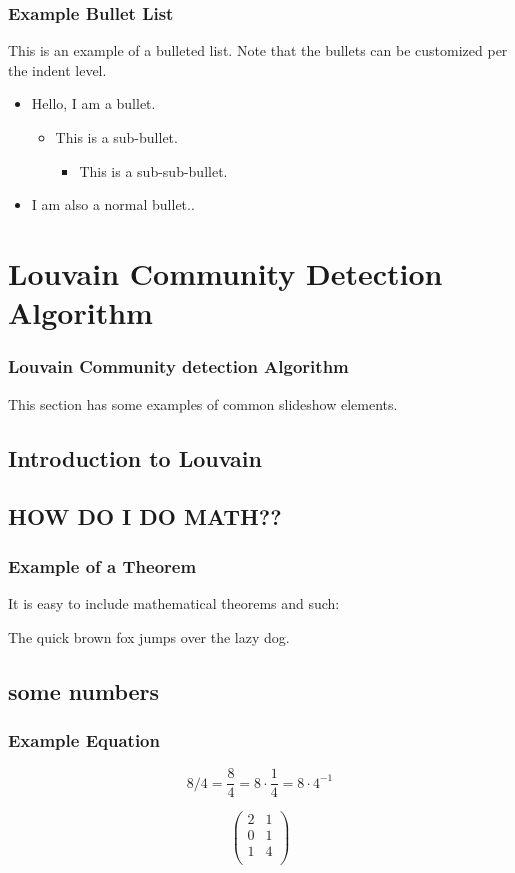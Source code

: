 \documentclass{beamer}
\begin{document}
\frame
{
	\frametitle{Example Bullet List}

	This is an example of a bulleted list. Note that the bullets can be customized per the indent level.
	
	\begin{itemize}
	\item Hello, I am a bullet.
	\begin{itemize}
		\item This is a sub-bullet.
		\begin{itemize}
			\item This is a sub-sub-bullet.
		\end{itemize}
	\end{itemize}
	\vspace{\baselineskip}
	\item I am also a normal bullet..
	\end{itemize}
}

\section{Louvain Community Detection Algorithm}

\frame
{
	\frametitle{Louvain Community detection Algorithm}

	This section has some examples of common slideshow elements.
}

\subsection{Introduction to Louvain}

\frame
{
	
}

\subsection{HOW DO I DO MATH??}
\frame
{
	\frametitle{Example of a Theorem}
	It is easy to include mathematical theorems and such:
	\begin{theorem}
	The quick brown fox jumps over the lazy dog.
	\end{theorem}
}


\subsection{some numbers}
\frame
{
	\frametitle{Example Equation}

	\[8 / 4 = \frac{8}{4} = 8 \cdot \frac{1}{4} = 8 \cdot 4^{-1}\]
	
	\[\left( \begin{array}{cc}
	2 & 1 \\
	0 & 1 \\
	1 & 4 \\
	\end{array} \right)\]
}
\end{document}
